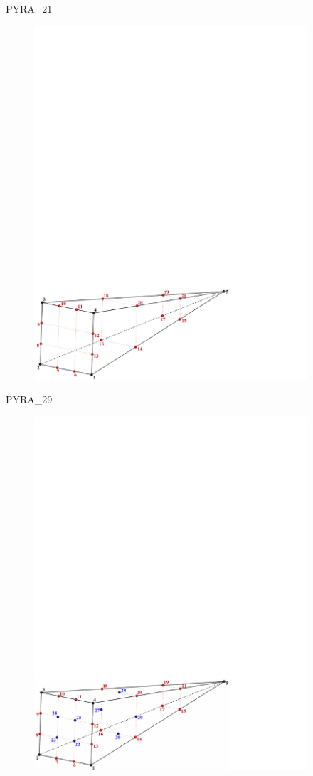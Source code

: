 {{{PYRA\_21
\begin{figure}[!htb]
   \includegraphics[width=4in]{conv.figs/TecplotFiles_Cubic_Element/All_Figures/pyramid_21}
\end{figure}

\bigskip

PYRA\_29
\begin{figure}[!htb]
   \includegraphics[width=4in]{conv.figs/TecplotFiles_Cubic_Element/All_Figures/pyramid_29}
\end{figure}

}}}
